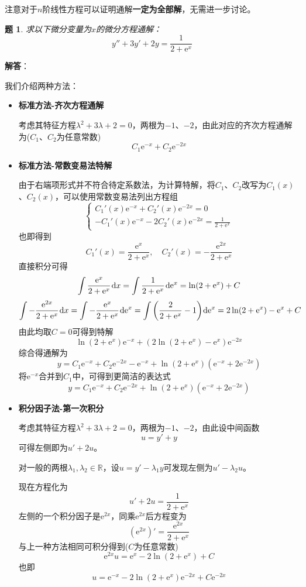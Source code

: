 \documentclass[a4paper,UTF8,fontset=windows,AutoFakeBold]{ctexart}
\newcommand*{\dr}{\hspace{0.07em}\mathrm{d}}
\newcommand*{\er}{\mathrm{e}}
\newcommand*{\rb}{\mathbb{R}}
\newcommand*{\note}{\noindent *}
\theoremstyle{ex}
\newtheorem{exercise}{题}
\newcommand{\sol}[1]{{\vspace{5pt}\kaishu\noindent\textbf{解答}：\vspace{-3pt}
\begin{compactitem}
    \item[] #1
\end{compactitem}
}}
\begin{document}
\note 注意对于$n$阶线性方程可以证明通解\textbf{一定为全部解}，无需进一步讨论。

\begin{framed}
\begin{exercise}
    求以下微分变量为$x$的微分方程通解：
    $$y''+3y'+2y=\frac{1}{2+\er^x}$$
\end{exercise}
\sol{
    我们介绍两种方法：
    \begin{itemize}
        \item \textbf{标准方法-齐次方程通解}
        
        考虑其特征方程$\lambda^2+3\lambda+2=0$，两根为$-1$、$-2$，由此对应的齐次方程通解为($C_1$、$C_2$为任意常数)
        $$C_1\er^{-x}+C_2\er^{-2x}$$

        \item \textbf{标准方法-常数变易法特解}
        
        由于右端项形式并不符合待定系数法，为计算特解，将$C_1$、$C_2$改写为$C_1(x)$、$C_2(x)$，可以使用常数变易法列出方程组
        $$\begin{cases}C_1'(x)\er^{-x}+C_2'(x)\er^{-2x}=0\\-C_1'(x)\er^{-x}-2C_2'(x)\er^{-2x}=\frac{1}{2+\er^x}\end{cases}$$
        也即得到
        $$C_1'(x)=\frac{\er^x}{2+\er^x},\quad C_2'(x)=-\frac{\er^{2x}}{2+\er^x}$$
        直接积分可得
        $$\int\frac{\er^x}{2+\er^x}\dr x=\int\frac{1}{2+\er^x}\dr\er^x=\ln(2+\er^x)+C$$
        $$\int-\frac{\er^{2x}}{2+\er^x}\dr x=\int-\frac{\er^x}{2+\er^x}\dr\er^x=\int\bigg(\frac{2}{2+\er^x}-1\bigg)\dr\er^x=2\ln(2+\er^x)-\er^x+C$$
        由此均取$C=0$可得到特解
        $$\ln(2+\er^x)\er^{-x}+(2\ln(2+\er^x)-\er^x)\er^{-2x}$$
        综合得通解为
        $$y=C_1\er^{-x}+C_2\er^{-2x}-\er^{-x}+\ln(2+\er^x)(\er^{-x}+2\er^{-2x})$$
        将$\er^{-x}$合并到$C_1$中，可得到更简洁的表达式
        $$y=C_1\er^{-x}+C_2\er^{-2x}+\ln(2+\er^x)(\er^{-x}+2\er^{-2x})$$

        \item \textbf{积分因子法-第一次积分}

        考虑其特征方程$\lambda^2+3\lambda+2=0$，两根为$-1$、$-2$，由此设中间函数
        $$u=y'+y$$
        可得左侧即为$u'+2u$。

        \note 对一般的两根$\lambda_1,\lambda_2\in\rb$，设$u=y'-\lambda_1y$可发现左侧为$u'-\lambda_2u$。

        现在方程化为
        $$u'+2u=\frac{1}{2+\er^x}$$
        左侧的一个积分因子是$\er^{2x}$，同乘$\er^{2x}$后方程变为
        $$(\er^{2x})'=\frac{\er^{2x}}{2+\er^x}$$
        与上一种方法相同可积分得到($C$为任意常数)
        $$\er^{2x}u=\er^x-2\ln(2+\er^x)+C$$
        也即
        $$u=\er^{-x}-2\ln(2+\er^x)\er^{-2x}+C\er^{-2x}$$


\end{itemize}}
\end{framed}
\end{document}
